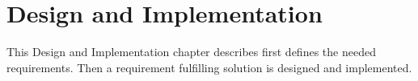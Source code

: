 \section{Design and Implementation}
This Design and Implementation chapter describes first defines the needed requirements. Then a requirement fulfilling solution is designed and implemented.


